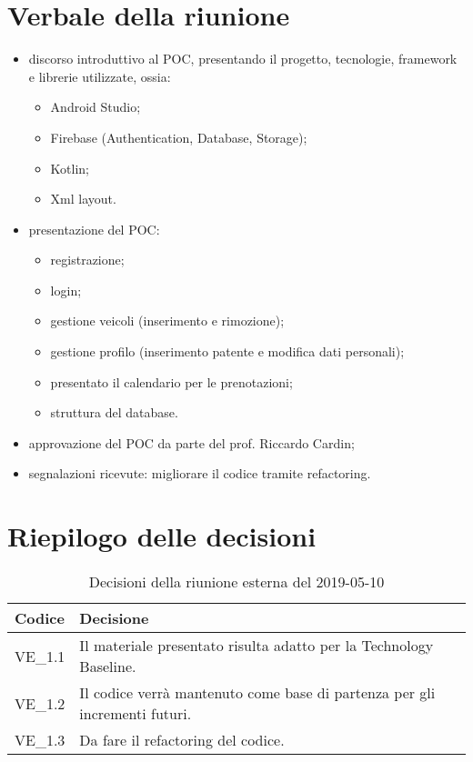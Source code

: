 \section{Verbale della riunione}
\begin{itemize}
	\item discorso introduttivo al POC, presentando il progetto, tecnologie, framework e librerie utilizzate, ossia:
	\begin{itemize}
		\item Android Studio;
		\item Firebase (Authentication, Database, Storage);
		\item Kotlin;
		\item Xml layout.
	\end{itemize}	
	\item presentazione del POC:
	\begin{itemize}
		\item registrazione;
		\item login;
		\item gestione veicoli (inserimento e rimozione);
		\item gestione profilo (inserimento patente e modifica dati personali);
		\item presentato il calendario per le prenotazioni;
		\item struttura del database.
	\end{itemize}
	\item approvazione del POC da parte del prof. Riccardo Cardin; 
	\item segnalazioni ricevute: migliorare il codice tramite refactoring.
\end{itemize}	 

\pagebreak
\section{Riepilogo delle decisioni}

	
	\begin{longtable}{ >{\centering}p{} >{}p{}}
		\caption{Decisioni della riunione esterna del 2019-05-10}\\	
		\rowcolorhead
		\textbf{\color{white}Codice} 
		& \centering\textbf{\color{white}Decisione} 
		\tabularnewline 
		\endfirsthead
		VE\_1.1 & Il materiale presentato risulta adatto per la Technology Baseline.
		
		\tabularnewline 
		VE\_1.2 & Il codice verrà mantenuto come base di partenza per gli incrementi futuri.
		
		\tabularnewline 
		VE\_1.3 & Da fare il refactoring del codice.
		
	
	\end{longtable}
	




